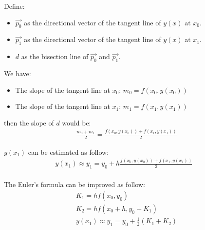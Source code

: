     \par Define:
      \begin{itemize}
        \item $\vec{p_0}$ as the directional vector of the tangent line of $y(x)$
          at $x_0$.
        \item $\vec{p_1}$ as the directional vector of the tangent line of $y(x)$
          at $x_1$.
        \item $d$ as the bisection line of $\vec{p_0}$ and $\vec{p_1}$.
      \end{itemize}
    \par We have:
      \begin{itemize}
        \item The slope of the tangent line at $x_0$:  $m_0 = f(x_0, y(x_0))$
        \item The slope of the tangent line at $x_1$:  $m_1 = f(x_1, y(x_1))$
      \end{itemize}
      then the slope of $d$ would be:
      \begin{align*}
        \frac{m_0 + m_1}{2} = \frac{f(x_0, y(x_0)) + f(x_1, y(x_1))}{2}
      \end{align*}
    \par $y(x_1)$ can be estimated as follow:
      \begin{align*}
      & y(x_1) \approx y_1 = y_0 + h\frac{f(x_0, y(x_0)) + f(x_1, y(x_1))}{2} && \\
      \end{align*}
    \par The Euler's formula can be improved as follow:
      \begin{align*}
        K_1 = hf(x_0, y_0) \\
        K_2 = hf(x_0 + h, y_0 + K_1) \\
        y(x_1) \approx y_1 = y_0 + \frac{1}{2} (K_1 + K_2)
      \end{align*}
